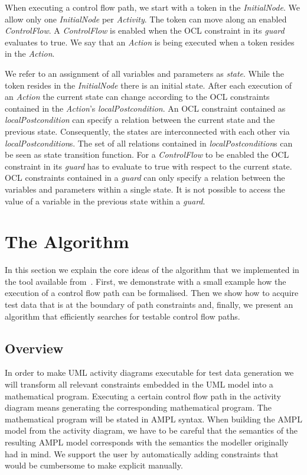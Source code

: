 \documentclass[runningheads,a4paper]{llncs}%
\newcommand{\UMLType}[1]{\textsf{\textit{#1}}} %
\newcommand{\UMLReference}[1]{\textsf{\textit{#1}}} %
\begin{document}
When executing a control flow path, we start with a token in the
\UMLType{InitialNode}. We allow only one \UMLType{InitialNode} per
\UMLType{Activity}. The token can move along an enabled \UMLType{ControlFlow}. A
\UMLType{ControlFlow} is enabled when the OCL constraint in its
\UMLReference{guard} evaluates to true. We say that an \UMLType{Action} is being
executed when a token resides in the \UMLType{Action}.

We refer to an assignment of all variables and parameters as \emph{state}. While
the token resides in the \UMLType{InitialNode} there is an initial state. After
each execution of an \UMLType{Action} the current state can change according to
the OCL constraints contained in the \UMLType{Action}'s
\UMLReference{localPostcondition}. An OCL constraint contained as
\UMLType{localPostcondition} can specify a relation between the current state
and the previous state. Consequently, the states are interconnected with each
other via \UMLReference{localPostcondition}s. The set of all relations contained
in \UMLType{localPostcondition}s can be seen as state transition function. For a
\UMLType{ControlFlow} to be enabled the OCL constraint in its
\UMLReference{guard} has to evaluate to true with respect to the current state.
OCL constraints contained in a \UMLReference{guard} can only specify a relation
between the variables and parameters within a single state. It is not possible
to access the value of a variable in the previous state within a
\UMLReference{guard}.
\section{The Algorithm}%
\label{sec:Algorithm}%
In this section we explain the core ideas of the algorithm that we implemented
in the tool available from~\cite{PartegWebsite}. First, we demonstrate with a
small example how the execution of a control flow path can be formalised. Then
we show how to acquire test data that is at the boundary of path constraints
and, finally, we present an algorithm that efficiently searches for testable
control flow paths.%
\subsection{Overview}%
In order to make UML activity diagrams executable for test data generation we
will transform all relevant constraints embedded in the UML model into a
mathematical program. Executing a certain control flow path in the activity
diagram means generating the corresponding mathematical program. The
mathematical program will be stated in AMPL syntax. 
When building the AMPL model from the activity diagram, we have to be careful
that the semantics of the resulting AMPL model corresponds with the semantics
the modeller originally had in mind. We support the user by automatically adding
constraints that would be cumbersome to make explicit manually.
\end{document}
